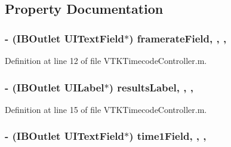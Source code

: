 \subsection{Property Documentation}
\hypertarget{category_v_t_k_timecode_controller_07_08_a01e4a2a269595de1df65c643f67ae3c6}{
\subsubsection[{framerate\+Field}]{\setlength{\rightskip}{0pt plus 5cm}-\/ (I\+B\+Outlet U\+I\+Text\+Field$\ast$) framerate\+Field\hspace{0.3cm}{\ttfamily [read]}, {\ttfamily [write]}, {\ttfamily [nonatomic]}, {\ttfamily [weak]}}}\label{category_v_t_k_timecode_controller_07_08_a01e4a2a269595de1df65c643f67ae3c6}


Definition at line 12 of file V\+T\+K\+Timecode\+Controller.\+m.

\hypertarget{category_v_t_k_timecode_controller_07_08_a4e46e7e9fbc90e39d28dcf2e0962c891}{
\subsubsection[{results\+Label}]{\setlength{\rightskip}{0pt plus 5cm}-\/ (I\+B\+Outlet U\+I\+Label$\ast$) results\+Label\hspace{0.3cm}{\ttfamily [read]}, {\ttfamily [write]}, {\ttfamily [nonatomic]}, {\ttfamily [weak]}}}\label{category_v_t_k_timecode_controller_07_08_a4e46e7e9fbc90e39d28dcf2e0962c891}


Definition at line 15 of file V\+T\+K\+Timecode\+Controller.\+m.

\hypertarget{category_v_t_k_timecode_controller_07_08_a24852fbe59ab28cd6a03cd87f63233fa}{
\subsubsection[{time1\+Field}]{\setlength{\rightskip}{0pt plus 5cm}-\/ (I\+B\+Outlet U\+I\+Text\+Field$\ast$) time1\+Field\hspace{0.3cm}{\ttfamily [read]}, {\ttfamily [write]}, {\ttfamily [nonatomic]}, {\ttfamily [weak]}}}\label{category_v_t_k_timecode_controller_07_08_a24852fbe59ab28cd6a03cd87f63233fa}


